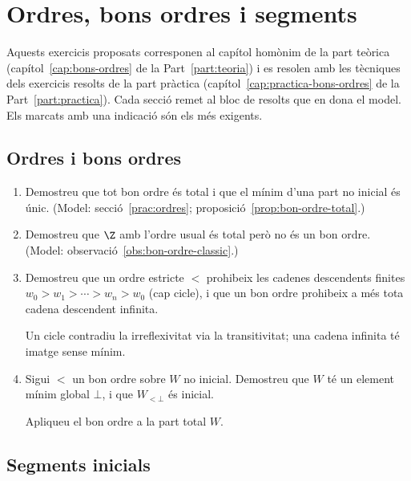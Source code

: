 \chapter{Ordres, bons ordres i segments}\label{cap:exercicis-bons-ordres}

Aquests exercicis proposats corresponen al capítol homònim de la part teòrica (capítol~\ref{cap:bons-ordres} de la Part~\ref{part:teoria}) i es resolen amb les tècniques dels exercicis resolts de la part pràctica (capítol~\ref{cap:practica-bons-ordres} de la Part~\ref{part:practica}). Cada secció remet al bloc de resolts que en dona el model. Els marcats amb una indicació són els més exigents.

\section{Ordres i bons ordres}

\begin{enumerate}
  \item Demostreu que tot bon ordre és total i que el mínim d'una part no inicial és únic. (Model: secció~\ref{prac:ordres}; proposició~\ref{prop:bon-ordre-total}.)

  \item Demostreu que \(\Z\) amb l'ordre usual és total però no és un bon ordre. (Model: observació~\ref{obs:bon-ordre-classic}.)

  \item Demostreu que un ordre estricte \({<}\) prohibeix les cadenes descendents finites \(w_0>w_1>\cdots>w_n>w_0\) (cap cicle), i que un bon ordre prohibeix a més tota cadena descendent infinita. \begin{indicacio}Un cicle contradiu la irreflexivitat via la transitivitat; una cadena infinita té imatge sense mínim.\end{indicacio}

  \item Sigui \({<}\) un bon ordre sobre \(W\) no inicial. Demostreu que \(W\) té un element mínim global \(\bot\), i que \(W_{<\bot}\) és inicial. \begin{indicacio}Apliqueu el bon ordre a la part total \(W\).\end{indicacio}
\end{enumerate}

\section{Segments inicials}

